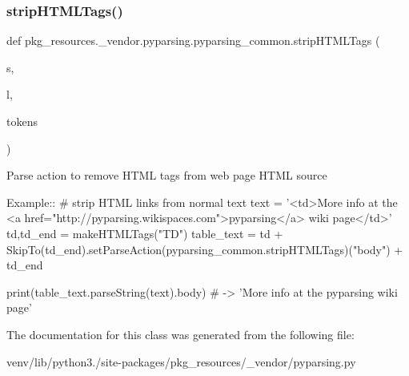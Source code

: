 \subsubsection{\texorpdfstring{strip\+H\+T\+M\+L\+Tags()}{stripHTMLTags()}}
{\footnotesize\ttfamily def pkg\+\_\+resources.\+\_\+vendor.\+pyparsing.\+pyparsing\+\_\+common.\+strip\+H\+T\+M\+L\+Tags (\begin{DoxyParamCaption}\item[{}]{s,  }\item[{}]{l,  }\item[{}]{tokens }\end{DoxyParamCaption})\hspace{0.3cm}{\ttfamily [static]}}

\begin{DoxyVerb}Parse action to remove HTML tags from web page HTML source

Example::
    # strip HTML links from normal text 
    text = '<td>More info at the <a href="http://pyparsing.wikispaces.com">pyparsing</a> wiki page</td>'
    td,td_end = makeHTMLTags("TD")
    table_text = td + SkipTo(td_end).setParseAction(pyparsing_common.stripHTMLTags)("body") + td_end
    
    print(table_text.parseString(text).body) # -> 'More info at the pyparsing wiki page'
\end{DoxyVerb}
 

The documentation for this class was generated from the following file\+:\begin{DoxyCompactItemize}
\item 
venv/lib/python3./site-\/packages/pkg\+\_\+resources/\+\_\+vendor/pyparsing.\+py\end{DoxyCompactItemize}
